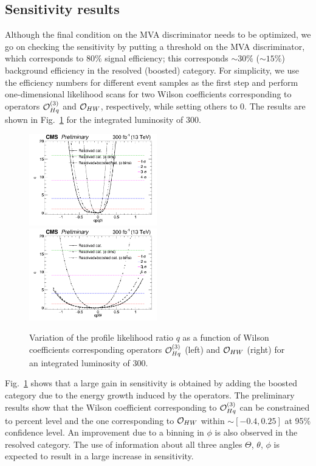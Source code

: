 \documentclass[a4paper,11pt]{article}
\begin{document}
\subsection{Sensitivity results}

Although the final condition on the MVA discriminator needs to be optimized, 
we go on checking the sensitivity by putting a threshold on the MVA discriminator, 
which corresponds to $80\%$ signal efficiency; this corresponds $\sim 30\%$ ($\sim 15\%$) background efficiency in the resolved (boosted) category.
For simplicity, we use the efficiency numbers for different event samples as the first step and perform one-dimensional likelihood scans for two Wilson coefficients corresponding to operators ${\cal O}^{(3)}_{Hq}$ and ${\cal O}_{HW}$, respectively, while setting others to $0$. The results are shown in Fig.~\ref{fig:NLL} for the integrated luminosity of 300\fbinv.
\begin{figure}[hbtp]
\begin{center}
\includegraphics[width=0.495\textwidth]{Figures/RECO/Full_NLL_WC_cpq3i_fine_300fb_opt1.png}
\includegraphics[width=0.495\textwidth]{Figures/RECO/Full_NLL_WC_cpW_fine_300fb.png}
\end{center}
\caption{
Variation of the profile likelihood ratio $q$ as a function of Wilson coefficients corresponding operators ${\cal O}^{(3)}_{Hq}$ (left) and ${\cal O}_{HW}$ (right) for an integrated luminosity of 300\fbinv.
}
\label{fig:NLL}
\end{figure}
Fig.~\ref{fig:NLL} shows that a large gain in sensitivity is obtained by adding the boosted category due to the energy growth induced by the operators. 
The preliminary results show that the Wilson coefficient corresponding to ${\cal O}^{(3)}_{Hq}$ can be constrained to percent level and the one corresponding to ${\cal O}_{HW}$ within $\sim [-0.4,0.25]$ at 95\% confidence level. 
An improvement due to a binning in $\phi$ is also observed in the resolved category.
The use of information about all three angles $\Theta$, $\theta$, $\phi$ is expected to result in a large increase in sensitivity.
\end{document}
